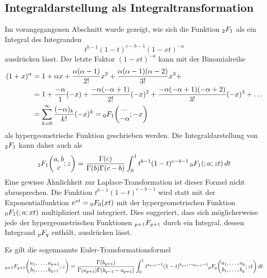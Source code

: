 \subsection{Integraldarstellung als Integraltransformation}
Im vorangegangenen Abschnitt wurde gezeigt, wie sich die Funktion
$\mathstrut_2F_1$ als ein Integral des Integranden
\[
t^{b-1}(1-t)^{c-b-1} (1-xt)^{-a}
\]
ausdrücken lässt.
Der letzte Faktor $(1-xt)^{-a}$ kann mit der Binomialreihe
\begin{align*}
(1+x)^\alpha
&=
1
+ 
\alpha x
+
\frac{\alpha(\alpha-1)}{2!}x^2
+
\frac{\alpha(\alpha-1)(\alpha-2)}{3!}x^3
+
\\
&=
1
+
\frac{-\alpha}{1}(-x)
+
\frac{-\alpha(-\alpha+1)}{2!} (-x)^2
+
\frac{-\alpha(-\alpha+1)(-\alpha+2)}{3!} (-x)^3
+
\dots
\\
&=
\sum_{k=0}^\infty \frac{(-\alpha)_k}{k!} (-x)^k
=
\mathstrut_0F_1\biggl(
\begin{matrix}
\text{---}\\-\alpha
\end{matrix}
;-x
\biggr)
\end{align*}
als hypergeometrische Funktion geschrieben werden.
Die Integraldarstellung von $\mathstrut_2F_1$ kann daher auch als
\[
\mathstrut_2F_1\biggl(\begin{matrix}a,b\\c\end{matrix};z\biggr)
=
\frac{\Gamma(c)}{\Gamma(b)\Gamma(c-b)}
\int_0^1 t^{b-1}(1-t)^{c-b-1}
\,
\mathstrut_0F_1(;a;zt)\,dt
\]
Eine gewisse Ähnlichkeit zur Laplace-Transformation ist dieser
Formel nicht abzusprechen.
Die Funktion \( t^{b-1}(1-t)^{c-b-1} \) wird statt mit der
Exponentialfunktion $e^{xt} = \mathstrut_0F_0(xt)$ mit der
hypergeometrischen Funktion $\mathstrut_0F_1(;a;xt)$ multipliziert und
integriert.
Dies suggeriert, dass sich möglicherweise jede der hypergeometrischen
Funktionen $\mathstrut_{p+1}F_{q+1}$ durch ein Integral, dessen 
Integrand $\mathstrut_pF_q$ enthält, ausdrücken lässt.

\begin{satz}
Es gilt die sogennannte Euler-Transformationsformel
%
\[
\mathstrut_{p+1}F_{q+1}\biggl(
\begin{matrix}
a_1,\dots,a_{p+1}\\
b_1,\dots,b_{q+1}
\end{matrix}
;z
\biggr)
=
\frac{\Gamma(b_{q+1})}{\Gamma(a_{p+1})\Gamma(b_{q-1}-a_{p+1})}
\int_0^1
t^{a_{p+1}-1}(1-t)^{b_{q+1}-a_{p+1}-1}
\mathstrut_pF_q\biggl(
\begin{matrix}
a_1,\dots,a_p\\
b_1,\dots,b_q
\end{matrix};zt
\biggr)
\,dt
\]
\end{satz}


